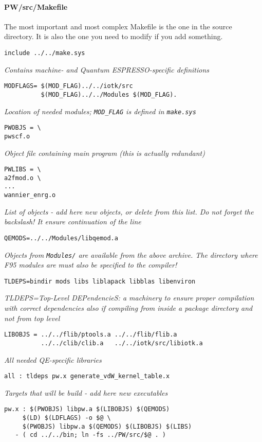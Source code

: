 \documentclass[12pt,a4paper]{article}
\def\qe{{\sc Quantum ESPRESSO}}
\begin{document}
\paragraph{PW/src/Makefile}
The most important and most complex Makefile is the one in the
source directory. It is also the one you need to modify if you 
add something.
\begin{verbatim}
include ../../make.sys
\end{verbatim}
{\em Contains machine- and \qe-specific definitions}
\begin{verbatim}
MODFLAGS= $(MOD_FLAG)../../iotk/src
          $(MOD_FLAG)../../Modules $(MOD_FLAG).
\end{verbatim}
{\em Location of needed modules; {\rm \texttt{MOD\_FLAG}} is defined in
\texttt{make.sys}}
\begin{verbatim}
PWOBJS = \
pwscf.o
\end{verbatim}
{\em Object file containing main program (this is actually redundant)}
\begin{verbatim}
PWLIBS = \
a2fmod.o \
...
wannier_enrg.o
\end{verbatim}
{\em List of objects - add here new objects, or delete from this list. Do not
forget the backslash! It ensure continuation of the line}
\begin{verbatim}
QEMODS=../../Modules/libqemod.a
\end{verbatim}
{\em Objects from {\rm\texttt{Modules/}} are available from the above archive.
The directory where F95 modules are must also be specified to the compiler!}
\begin{verbatim}
TLDEPS=bindir mods libs liblapack libblas libenviron
\end{verbatim}
{\em TLDEPS=Top-Level DEPendencieS: a machinery to ensure proper
compilation with correct dependencies also if compiling from inside
a package directory and not from top level}
\begin{verbatim}
LIBOBJS = ../../flib/ptools.a ../../flib/flib.a
          ../../clib/clib.a   ../../iotk/src/libiotk.a
\end{verbatim}
{\em All needed QE-specific libraries}
\begin{verbatim}
all : tldeps pw.x generate_vdW_kernel_table.x
\end{verbatim}
{\em Targets that will be build - add here new executables}
\begin{verbatim}
pw.x : $(PWOBJS) libpw.a $(LIBOBJS) $(QEMODS)
     $(LD) $(LDFLAGS) -o $@ \
     $(PWOBJS) libpw.a $(QEMODS) $(LIBOBJS) $(LIBS)
   - ( cd ../../bin; ln -fs ../PW/src/$@ . )
\end{verbatim}
\end{document}
